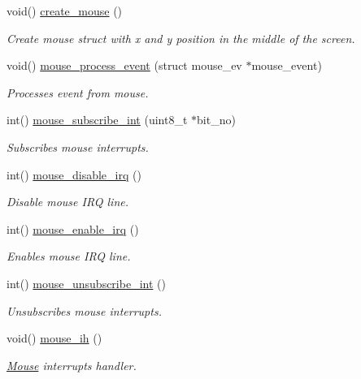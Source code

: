 \begin{DoxyCompactItemize}
\item 
void() \hyperlink{group__mouse_gad2dbdfeaa921e9d7a2796bfe003670a7}{create\+\_\+mouse} ()
\begin{DoxyCompactList}\small\item\em Create mouse struct with x and y position in the middle of the screen. \end{DoxyCompactList}\item 
void() \hyperlink{group__mouse_gadd8392c6469ceff59d345a3a7ff1027a}{mouse\+\_\+process\+\_\+event} (struct mouse\+\_\+ev $\ast$mouse\+\_\+event)
\begin{DoxyCompactList}\small\item\em Processes event from mouse. \end{DoxyCompactList}\item 
int() \hyperlink{group__mouse_ga20285aed4b3ef45812cd967532dd09db}{mouse\+\_\+subscribe\+\_\+int} (uint8\+\_\+t $\ast$bit\+\_\+no)
\begin{DoxyCompactList}\small\item\em Subscribes mouse interrupts. \end{DoxyCompactList}\item 
int() \hyperlink{group__mouse_gaab2e4485c75ef16ea9fbd7662bf12e23}{mouse\+\_\+disable\+\_\+irq} ()
\begin{DoxyCompactList}\small\item\em Disable mouse I\+RQ line. \end{DoxyCompactList}\item 
int() \hyperlink{group__mouse_gab07d3648ab5a4565e55fbf0fa0904bd6}{mouse\+\_\+enable\+\_\+irq} ()
\begin{DoxyCompactList}\small\item\em Enables mouse I\+RQ line. \end{DoxyCompactList}\item 
int() \hyperlink{group__mouse_ga3ecf823d80520009ae5e0d76ae40a3c3}{mouse\+\_\+unsubscribe\+\_\+int} ()
\begin{DoxyCompactList}\small\item\em Unsubscribes mouse interrupts. \end{DoxyCompactList}\item 
void() \hyperlink{group__mouse_ga210374b50462acdedab00df64d5cea3c}{mouse\+\_\+ih} ()
\begin{DoxyCompactList}\small\item\em \hyperlink{structMouse}{Mouse} interrupts handler. \end{DoxyCompactList}\item 

\end{DoxyCompactItemize}
